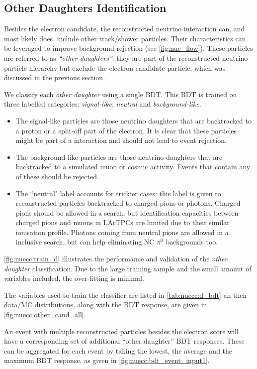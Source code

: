 \subsection{Other Daughters Identification}
\label{sc:nuecc:d_pid}

Besides the electron candidate, the reconstructed neutrino interaction can, and most likely does, include other track/shower particles. Their characteristics can be leveraged to improve background rejection (see \cref{fig:nue_flow}). These particles are referred to as \textit{``other daughters''}: they are part of the reconstructed neutrino particle hierarchy but exclude the electron candidate particle, which was discussed in the previous section.
\par 
We classify each \textit{other daughter} using a single BDT. This BDT is trained on three labelled categories: \emph{signal-like}, \emph{neutral} and \emph{background-like}. 
\begin{itemize}
\item The signal-like particles are those neutrino daughters that are backtracked to a proton or a split-off part of the electron. It is clear that these particles might be part of a \nuecc interaction and should not lead to event rejection.
\item The background-like particles are those neutrino daughters that are backtracked to a simulated muon or cosmic activity. Events that contain any of these should be rejected. 
\item The ``neutral" label accounts for trickier cases: this label is given to reconstructed particles backtracked to charged pions or photons. Charged pions should be allowed in a \nuecc search, but identification capacities between charged pions and muons in LArTPCs are limited due to their similar ionisation profile. Photons coming from neutral pions are allowed in a \nuecc inclusive search, but can help eliminating NC $\pi^0$ backgrounds too.
\end{itemize}
\par
\cref{fig:nuecc:train_d} illustrates the performance and validation of the \textit{other daughter} classification. Due to the large training sample and the small amount of variables included, the over-fitting is minimal. 
\par
The variables used to train the classifier are listed in \cref{tab:nuecc:d_bdt} an their data/MC distributions, along with the BDT response, are given in \cref{fig:nuecc:other_cand_all}.
\par
An event with multiple reconstructed particles besides the electron score will have a corresponding set of additional ``other daughter'' BDT responses. These can be aggregated for each event by taking the lowest, the average and the maximum BDT response, as given in \cref{fig:nuecc:bdt_event_input1}.

